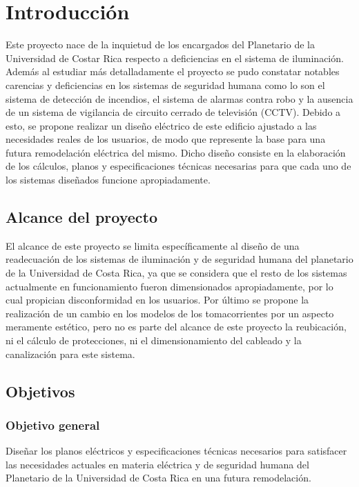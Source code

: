   \chapter{Introducción}
\label{C:introduccion}

Este proyecto nace de la inquietud de los encargados del Planetario de la Universidad de Costar Rica respecto a deficiencias en el sistema de iluminación. Además al estudiar más detalladamente el proyecto se pudo constatar notables carencias y deficiencias en los sistemas de seguridad humana como lo son el sistema de detección de incendios, el sistema de alarmas contra robo y la ausencia de un sistema de vigilancia de circuito cerrado de televisión (CCTV). Debido a esto, se propone realizar un diseño eléctrico de este edificio ajustado a las necesidades reales de los usuarios, de modo que represente la base para una futura remodelación eléctrica del mismo. Dicho diseño consiste en la elaboración de los cálculos, planos y especificaciones técnicas necesarias para que cada uno de los sistemas diseñados funcione apropiadamente.



\section{Alcance del proyecto}

El alcance de este proyecto se limita específicamente al diseño de una readecuación de los sistemas de iluminación y de seguridad humana del planetario de la Universidad de Costa Rica, ya que se considera que el resto de los sistemas actualmente en funcionamiento fueron dimensionados apropiadamente, por lo cual propician disconformidad en los usuarios. Por último se propone la realización de un cambio en los modelos de los tomacorrientes por un aspecto meramente estético, pero no es parte del alcance de este proyecto la reubicación, ni el cálculo de protecciones, ni el dimensionamiento del cableado y la canalización para este sistema.

\section{Objetivos}

\vspace{0.4cm}

\subsection{Objetivo general}
Diseñar los planos eléctricos y especificaciones técnicas necesarios para satisfacer las necesidades actuales en materia eléctrica y de seguridad humana del Planetario de la Universidad de Costa Rica en una futura remodelación. 

